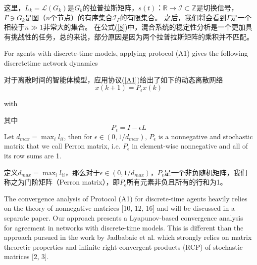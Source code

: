 \documentclass{article}
\begin{document}
\noindent 这里，$L_k = \mathcal{L}(G_k)$是$G_k$的拉普拉斯矩阵，$s(t)$：$\mathbb{R}\rightarrow \mathcal{I} \subset \mathbb{Z}$是切换信号，$\Gamma\ni G_k$是图（$n$个节点）的有序集合$\mathcal{I}_\Gamma$的有限集合。
之后，我们将会看到$\Gamma$是一个相较于$n\gg 1$非常大的集合。
在公式(\ref{8})中，混合系统的稳定性分析是一个更加具有挑战性的任务，总的来说，部分原因是因为两个拉普拉斯矩阵的乘积并不匹配。

{\color[gray]{0.5}
For agents with discrete-time models, applying protocol (A1) gives the following discretetime network dynamics
}

对于离散时间的智能体模型，应用协议(\ref{A1})给出了如下的动态离散网络
\begin{equation}
    x(k+1) = P_\epsilon x(k)
    \tag{9}
    \label{9}
\end{equation}

{\color[gray]{0.5}
\noindent with
}

\noindent 其中
\begin{equation}
    P_\epsilon = I - \epsilon L
    \tag{10}
    \label{10}
\end{equation}
\noindent Let $d_{max} = \max_il_{ii}$, then for $\epsilon\in (0,1/d_{max})$, $P_\epsilon$ is a nonnegative and stochastic matrix that we call Perron matrix, i.e. $P_\epsilon$ in element-wise nonnegative and all of its row sums are 1.

\noindent 定义$d_{max} = \max_il_{ii}$，那么对于$\epsilon\in (0,1/d_{max})$，$P_\epsilon$是一个非负随机矩阵，我们称之为门阶矩阵（Perron matrix），即$P_\epsilon$所有元素非负且所有的行和为1。

{\color[gray]{0.5}
The convergence analysis of Protocol (A1) for discrete-time agents heavily relies on the theory of nonnegative matrices [10, 12, 16] and will be discussed in a separate paper. 
Our approach presents a Lyapunov-based convergence analysis for agreement in networks with discrete-time models. 
This is diﬀerent than the approach pursued in the work by Jadbabaie et al. which strongly relies on matrix theoretic properties and {\color{green}inﬁnite right-convergent products (RCP) of stochastic matrices [2, 3]}.
}
\end{document}
